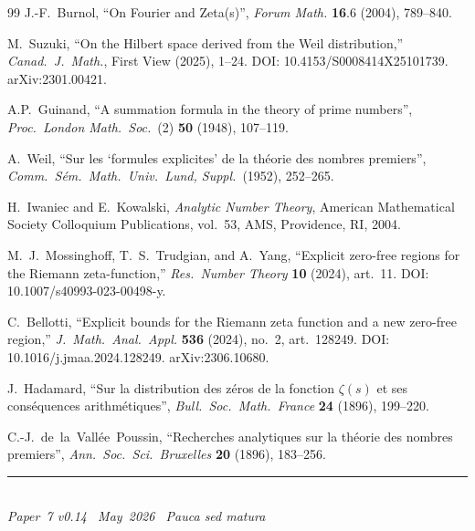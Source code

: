 \documentclass[11pt]{article}
\begin{document}
\begin{thebibliography}{99}
J.-F.~Burnol,
``On Fourier and Zeta(s)'',
\emph{Forum Math.} \textbf{16}.6 (2004), 789--840.

M.~Suzuki,
``On the Hilbert space derived from the Weil distribution,''
\textit{Canad.\ J.\ Math.}, First View (2025), 1--24.
DOI: 10.4153/S0008414X25101739.
arXiv:2301.00421.

A.P.~Guinand,
``A summation formula in the theory of prime numbers'',
\emph{Proc.\ London Math.\ Soc.}\ (2) \textbf{50} (1948), 107--119.

A.~Weil,
``Sur les `formules explicites' de la th\'{e}orie des nombres premiers'',
\emph{Comm.\ S\'{e}m.\ Math.\ Univ.\ Lund, Suppl.}\ (1952), 252--265.

H.~Iwaniec and E.~Kowalski,
\emph{Analytic Number Theory},
American Mathematical Society Colloquium Publications,
vol.~53, AMS, Providence, RI, 2004.

M.~J.~Mossinghoff, T.~S.~Trudgian, and A.~Yang,
``Explicit zero-free regions for the Riemann zeta-function,''
\textit{Res.\ Number Theory} \textbf{10} (2024), art.~11.
DOI: 10.1007/s40993-023-00498-y.

C.~Bellotti,
``Explicit bounds for the Riemann zeta function
and a new zero-free region,''
\textit{J.\ Math.\ Anal.\ Appl.} \textbf{536} (2024),
no.~2, art.~128249.
DOI: 10.1016/j.jmaa.2024.128249.
arXiv:2306.10680.

J.~Hadamard,
``Sur la distribution des z\'{e}ros de la fonction $\zeta(s)$
et ses cons\'{e}quences arithm\'{e}tiques'',
\emph{Bull.\ Soc.\ Math.\ France} \textbf{24} (1896), 199--220.

C.-J.~de~la~Vall\'{e}e~Poussin,
``Recherches analytiques sur la th\'{e}orie des nombres premiers'',
\emph{Ann.\ Soc.\ Sci.\ Bruxelles} \textbf{20} (1896), 183--256.

\end{thebibliography}

\enlargethispage{3\baselineskip}
\vspace*{\fill}
\begin{minipage}{\linewidth}
\rule{\linewidth}{0.4pt}\smallskip\\
\small\emph{Paper~7 v0.14 \textperiodcentered\ May~2026
\textperiodcentered\ Pauca sed matura}
\end{minipage}
\end{document}
